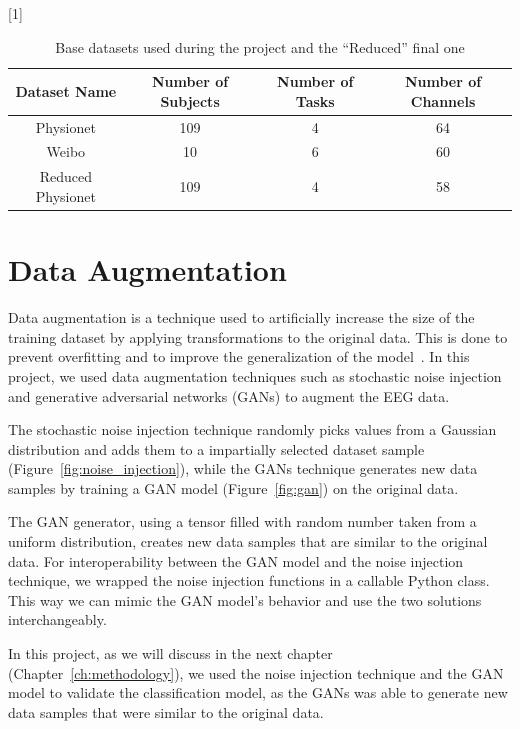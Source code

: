 \begin{table}[!htbp]
    \centering
    \scalebox{.8}[1]{
    \begin{tabular}{|c|c|c|c|}
        \hline
        \textbf{Dataset Name} & \textbf{Number of Subjects} & \textbf{Number of Tasks} & \textbf{Number of Channels}\\
        \hline
        \hline
        Physionet & 109 & 4 & 64\\
        \hline
        Weibo & 10 & 6 & 60\\
        \hline
        \hline
        Reduced Physionet & 109 & 4 & 58\\
        \hline
    \end{tabular}
    }
    \caption{Base datasets used during the project and the ``Reduced'' final one}\label{tab:datasamples}
\end{table}


\section{Data Augmentation}
Data augmentation is a technique used to artificially increase the size of the training dataset by applying transformations to the original data.
This is done to prevent overfitting and to improve the generalization of the model~\cite{wen2020time}.
In this project, we used data augmentation techniques such as stochastic noise injection and generative adversarial networks (GANs) to augment the EEG data.

The stochastic noise injection technique randomly picks values from a Gaussian distribution and adds them to a impartially selected dataset sample (Figure~\ref{fig:noise_injection}), while the GANs technique generates new data samples by training a GAN model (Figure~\ref{fig:gan}) on the original data.

The GAN generator, using a tensor filled with random number taken from a uniform distribution, creates new data samples that are similar to the original data.
For interoperability between the GAN model and the noise injection technique, we wrapped the noise injection functions in a callable Python class.
This way we can mimic the GAN model's behavior and use the two solutions interchangeably.

In this project, as we will discuss in the next chapter (Chapter~\ref{ch:methodology}), we used the noise injection technique and the GAN model to validate the classification model, as the GANs was able to generate new data samples that were similar to the original data.

